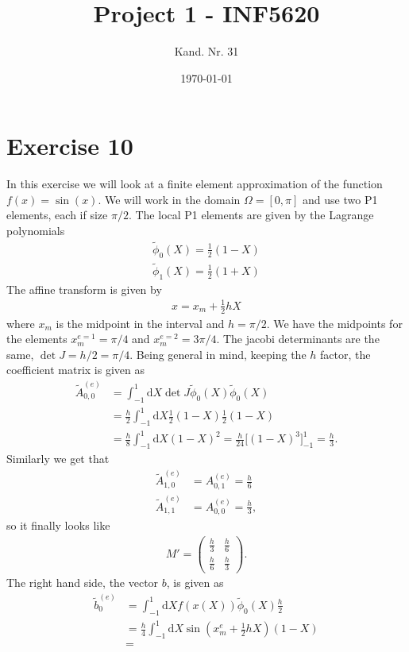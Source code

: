 \documentclass[a4paper,10pt]{article}
\title{Project 1 - INF5620}
\date{\today}
\author{Kand. Nr. 31}
\renewcommand{\(}{\left(}
\renewcommand{\)}{\right)}
\newcommand{\dm}[1]{\text{d}#1}
\begin{document}
\section*{Exercise 10}
In this exercise we will look at a finite element approximation of the function $f(x)=\sin(x)$. We will work in the domain $\Omega=[0,\pi]$ and use two P1 elements, each if size $\pi/2$. The local P1 elements are given by the Lagrange polynomials
\begin{align*}
  \tilde\phi_0(X) = \frac{1}{2}(1-X)\\
  \tilde\phi_1(X) = \frac{1}{2}(1+X)
\end{align*}
The affine transform is given by
\begin{align*}
  x = x_m + \frac{1}{2}hX
\end{align*}
where $x_m$ is the midpoint in the interval and $h=\pi/2$. We have the midpoints for the elements $x_m^{e=1}=\pi/4$ and $x_m^{e=2}=3\pi/4$. The jacobi determinants are the same, $\det J = h/2 = \pi/4$. Being general in mind, keeping the $h$ factor, the coefficient matrix is given as
\begin{align*}
  \tilde A^(e)_{0,0} &= \int_{-1}^1  \dm X \det J \tilde\phi_0(X)\tilde\phi_0(X)\\
  &= \frac{h}{2} \int_{-1}^1 \dm X \frac{1}{2}(1-X)\frac{1}{2}(1-X)\\
  &= \frac{h}{8} \int_{-1}^1 \dm X (1-X)^2 = \frac{h}{24} \Big[(1-X)^3\Big]^1_{-1} = \frac{h}{3}.
\end{align*}
Similarly we get that
\begin{align*}
  \tilde A^(e)_{1,0} &= A^(e)_{0,1} = \frac{h}{6}\\
  \tilde A^(e)_{1,1} &= A^(e)_{0,0} = \frac{h}{3},
\end{align*}
so it finally looks like
\begin{align*}
M' = \left( \begin{array}{cc}
\frac{h}{3} & \frac{h}{6}\\
\frac{h}{6} & \frac{h}{3}
\end{array}
\right).
\end{align*}
The right hand side, the vector $b$, is given as
\begin{align*}
  \tilde b_0^{(e)} &= \int_{-1}^1 \dm X f(x(X))\tilde\phi_0(X) \frac{h}{2} \\
  &= \frac{h}{4}\int_{-1}^1 \dm X \sin(x_m^{e} + \frac{1}{2}hX)(1-X)\\
  &= 
\end{align*}
\end{document}
